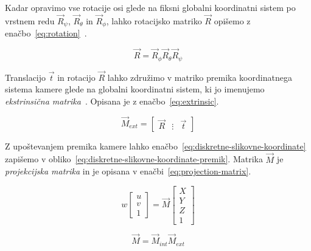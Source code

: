 Kadar opravimo vse rotacije osi glede na fiksni globalni koordinatni sistem po vrstnem redu $\vec{R}_\psi$, $\vec{R}_\theta$ in $\vec{R}_\phi$, lahko rotacijsko matriko $\vec{R}$ opišemo z enačbo~\eqref{eq:rotation}~\cite{bajd2011osnove}.


\begin{equation}
\vec{R} = \vec{R}_\phi \vec{R}_\theta \vec{R}_\psi
\label{eq:rotation}
\end{equation}


Translacijo $\vec{t}$ in rotacijo $\vec{R}$ lahko združimo v matriko premika koordinatnega sistema kamere glede na globalni koordinatni sistem, ki jo imenujemo \emph{ekstrinsična matrika}~\cite{trucco1998introductory}. Opisana je z enačbo~\eqref{eq:extrinsic}.

\begin{equation}
\vec{M}_{ext} = \begin{bmatrix}
	\vec{R} & \vdots & \vec{t}
\end{bmatrix}
\label{eq:extrinsic}
\end{equation}


Z upoštevanjem premika kamere lahko enačbo~\eqref{eq:diskretne-slikovne-koordinate} zapišemo v obliko~\eqref{eq:diskretne-slikovne-koordinate-premik}. Matrika $\vec{M}$ je \emph{projekcijska matrika} in je opisana v enačbi~\eqref{eq:projection-matrix}.

\begin{equation}
w \begin{bmatrix}
	u \\ v \\ 1
	\end{bmatrix} = \vec{M}
    \begin{bmatrix}
    X \\ Y \\ Z \\ 1
    \end{bmatrix}
\label{eq:diskretne-slikovne-koordinate-premik}
\end{equation}


\begin{equation}
\vec{M} = \vec{M}_{int} \vec{M}_{ext}
\label{eq:projection-matrix}
\end{equation}

